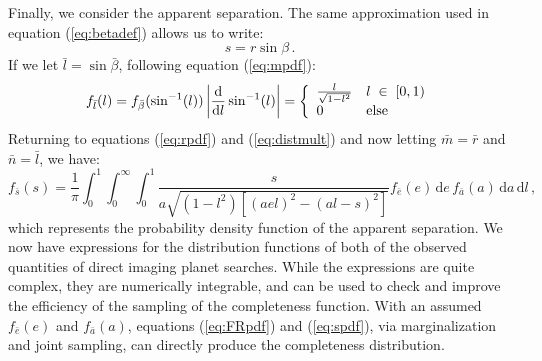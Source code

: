 Finally, we consider the apparent separation.  The same approximation used in equation (\ref{eq:betadef}) allows us to write:
\begin{equation}
s = r \sin \beta \,.
\end{equation}
If we let $\bar l = \sin\bar\beta$, following equation (\ref{eq:mpdf}):
\begin{equation}\label{eq:lpdf}
f_{\bar l}(l) = f_{\bar \beta}(\sin^{-1}(l)) \left| \frac{ \mathrm{d}}{ \mathrm{d} l} \sin^{-1}(l) \right| = 
\left\{
    \begin{array}{l l}
    \frac{l}{\sqrt{1 - l^2}} & l \; \in \; [0,1) \\
    0 & \mathrm{else} \end{array}\right.
    \end{equation}
Returning to equations  (\ref{eq:rpdf}) and (\ref{eq:distmult}) and now letting $\bar m = \bar r$ and $\bar n = \bar l$, we have:
\begin{equation}\label{eq:spdf}
f_{\bar s}(s) = \frac{1}{\pi}  \int_{0}^1 \int_{0}^{\infty} \int_{0}^{1} \frac{s}{a\sqrt{\left(1 - l^2\right)\left[(ael)^2 - (al-s)^2\right]}}f_{\bar{e}}(e) \, \mathrm{d}e \, f_{\bar{a}}(a)\, \mathrm{d}a \, \mathrm{d}l  \, ,
\end{equation}
which represents the probability density function of the apparent separation.  We now have expressions for the distribution functions of both of the observed quantities of direct imaging planet searches.  While the expressions are quite complex, they are numerically integrable, and can be used to check and improve the efficiency of the sampling of the completeness function.   With an assumed $f_{\bar e}(e)$ and $f_{\bar a}(a)$, equations (\ref{eq:FRpdf}) and (\ref{eq:spdf}), via marginalization and joint sampling, can directly produce the completeness distribution.

